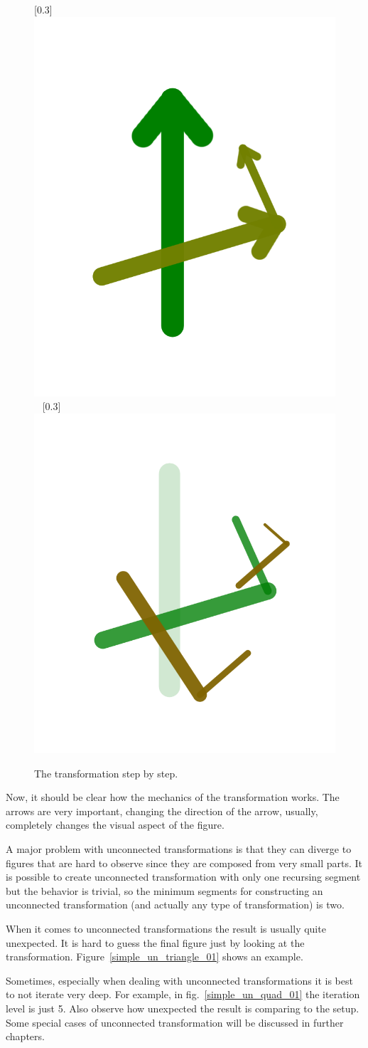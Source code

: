         \begin{figure}[H]
            \caption{\label{simple_un_line_exp_01} The transformation step by step.}
            \centering
            \subcaptionbox{}[0.3\textwidth]
                {\includegraphics[height=0.3\textwidth]{img/Simple_Techniques/Unconnect/simple_line_exp_01.png}}
            ~
            \subcaptionbox{}[0.3\textwidth]
                {\includegraphics[height=0.3\textwidth]{img/Simple_Techniques/Unconnect/simple_line_exp_02.png}}
        \end{figure}
        \FloatBarrier

        Now, it should be clear how the mechanics of the transformation works.
        The arrows are very important, changing the direction of the arrow, usually, completely changes the visual aspect of the figure.

        A major problem with unconnected transformations is that they can diverge to 
            figures that are hard to observe since they are composed from very small parts.
        It is possible to create unconnected transformation with only one recursing segment but the behavior is trivial, 
            so the minimum segments for constructing an unconnected transformation (and actually any type of transformation) is two.

        When it comes to unconnected transformations the result is usually quite unexpected.
        It is hard to guess the final figure just by looking at the transformation.
        Figure~\ref{simple_un_triangle_01} shows an example.

        Sometimes, especially when dealing with unconnected transformations it is best to not iterate very deep.
        For example, in fig.~\ref{simple_un_quad_01} the iteration level is just 5.
        Also observe how unexpected the result is comparing to the setup.
        Some special cases of unconnected transformation will be discussed in further chapters.

